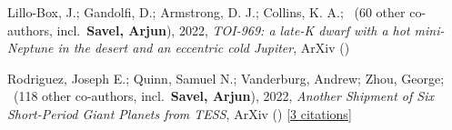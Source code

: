 \item[{\color{numcolor}\scriptsize2}] Lillo-Box, J.; Gandolfi, D.; Armstrong, D. J.; Collins, K. A.; \etal\ ({60} other co-authors, incl.\ \textbf{Savel, Arjun}), 2022, \emph{TOI-969: a late-K dwarf with a hot mini-Neptune in the desert and an eccentric cold Jupiter}, ArXiv ()

\item[{\color{numcolor}\scriptsize1}] Rodriguez, Joseph E.; Quinn, Samuel N.; Vanderburg, Andrew; Zhou, George; \etal\ ({118} other co-authors, incl.\ \textbf{Savel, Arjun}), 2022, \emph{Another Shipment of Six Short-Period Giant Planets from TESS}, ArXiv () [\href{https://ui.adsabs.harvard.edu/abs/2022arXiv220505709R}{3 citations}]